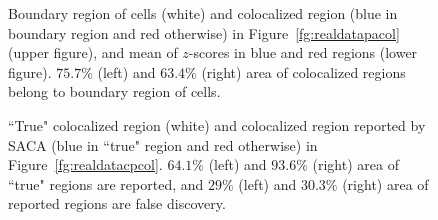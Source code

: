 \documentclass[10pt,twocolumn,twoside]{IEEEtran}
\begin{document}
\begin{figure}[h!]
    \centering
    \caption{Boundary region of cells (white) and colocalized region (blue in boundary region and red otherwise) in Figure~\ref{fg:realdatapacol} (upper figure), and mean of $z$-scores in blue and red regions (lower figure). $75.7\%$ (left) and $63.4\%$ (right) area of colocalized regions belong to boundary region of cells.}\label{fg:realdatapacolvalid}
\end{figure}

\begin{figure}[h!]
    \centering
    \caption{``True" colocalized region (white) and colocalized region reported by SACA (blue in ``true" region and red otherwise) in Figure~\ref{fg:realdatacpcol}. $64.1\%$ (left) and $93.6\%$ (right) area of ``true" regions are reported, and $29\%$ (left) and $30.3\%$ (right) area of reported regions are false discovery.}\label{fg:realdatacpcolvalid}
\end{figure}
\end{document}
